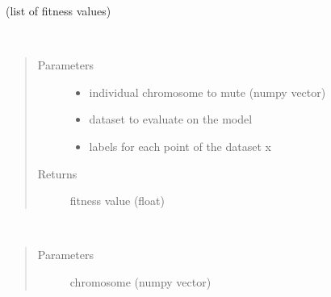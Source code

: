 \documentclass[letterpaper,10pt,english]{sphinxmanual}
\begin{document}
\begin{fulllineitems}
\begin{fulllineitems}
\begin{quote}
\begin{description}
\end{description}\end{quote}

(list of fitness values)

\end{fulllineitems}


\begin{fulllineitems}
\label{\detokenize{index:genetic_optimizer.GeneticRegularizator.fitness}}~\begin{quote}\begin{description}
\item[{Parameters}] \leavevmode\begin{itemize}
\item {} 
 \textendash{} individual chromosome to mute (numpy vector)

\item {} 
 \textendash{} dataset to evaluate on the model

\item {} 
 \textendash{} labels for each point of the dataset x

\end{itemize}

\item[{Returns}] \leavevmode
fitness value (float)

\end{description}\end{quote}

\end{fulllineitems}


\begin{fulllineitems}
\label{\detokenize{index:genetic_optimizer.GeneticRegularizator.transform_weights}}~\begin{quote}\begin{description}
\item[{Parameters}] \leavevmode
{} \textendash{} chromosome (numpy vector)


\end{description}
\end{quote}
\end{fulllineitems}
\end{fulllineitems}
\end{document}
